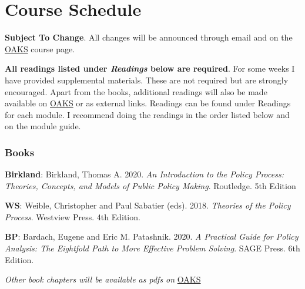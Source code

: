 \hypertarget{course-schedule}{%
\section{Course Schedule}\label{course-schedule}}

\textbf{Subject To Change}. All changes will be announced through email
and on the \href{https://lms.cofc.edu}{OAKS} course page.

\vspace{0.10in}

\noindent \textbf{All readings listed under \emph{Readings} below are
required}. For some weeks I have provided supplemental materials. These
are not required but are strongly encouraged. Apart from the books,
additional readings will also be made available on
\href{https://lms.cofc.edu}{OAKS} or as external links. Readings can be
found under Readings for each module. I recommend doing the readings in
the order listed below and on the module guide.

\hypertarget{books}{%
\subsubsection{Books}\label{books}}

\faBook \hspace{0.005in} \textbf{Birkland}: Birkland, Thomas A. 2020.
\emph{An Introduction to the Policy Process: Theories, Concepts, and
Models of Public Policy Making}. Routledge. 5th Edition

\vspace{0.10in}

\noindent \faBook \hspace{0.005in} \textbf{WS}: Weible, Christopher and
Paul Sabatier (eds). 2018. \emph{Theories of the Policy Process}.
Westview Press. 4th Edition.

\vspace{0.10in}

\noindent \faBook \hspace{0.005in} \textbf{BP}: Bardach, Eugene and Eric
M. Patashnik. 2020. \emph{A Practical Guide for Policy Analysis: The
Eightfold Path to More Effective Problem Solving}. SAGE Press. 6th
Edition.

\vspace{0.10in}

\noindent \faBook \hspace{0.005in} \emph{Other book chapters will be
available as pdfs on} \href{https://lms.cofc.edu}{OAKS}

